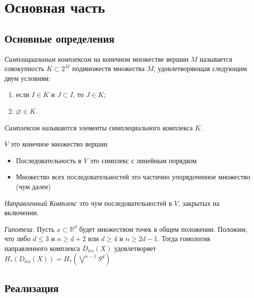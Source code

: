 \section{Основная часть}

\subsection{Основные определения}
\begin{definition}
 {\it Симплициальным комплексом} на конечном множестве вершин $M$ называется совокупность $K \subset 2^{M}$ подмножеств множества $M$, удовлетворяющая следующим двум условиям:
    \begin{enumerate}
        \item если $I \in K$ и $J \subset I$, то $J \in K$;
        \item $\varnothing \in K$.
    \end{enumerate}
\end{definition}

\begin{definition}
{\it Симплексом} называются элементы симплециального комплекса $K$.
\end{definition}

\begin{definition}
$V$ это конечное множество вершин
\begin{itemize}
    \item Последовательность в $V$ это симплекс с линейным порядком 
    \item Множество всех последовательностей это частично упорядоченное множество (чум далее)
\end{itemize}
\end{definition}

\begin{definition}
{\it Направленный Комплекс} это чум последовательностей в $V$, закрытых на включении.
\end{definition}

\begin{definition}
{\it Гипотеза.} Пусть $x \subset \mathbb{R}^d$ будет множеством точек в общем положении. Положим, что либо $d \leq 3$ и $n \geq d + 2$ или $d \geq 4$ и $n \geq 2d - 1$. Тогда гомология направленного комплекса $D_{lin}(X)$ удовлетворяет $H_{*}(D_{lin}(X)) = H_{*}(\bigvee^{n - 1} S^d)$ 
\end{definition}

\subsection{Реализация}

